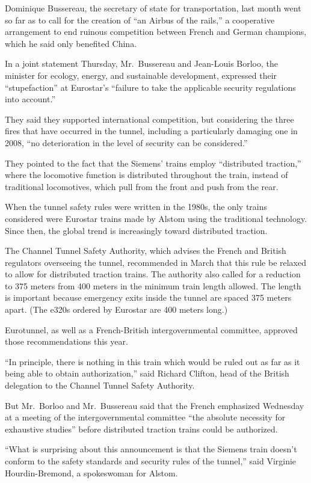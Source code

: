 ﻿\documentclass[12pt]{article}
\begin{document}
Dominique Bussereau, the secretary of state for transportation, last month went so far as to call
for the creation of ``an Airbus of the rails,'' a cooperative arrangement to end ruinous competition
between French and German champions, which he said only benefited China.

In a joint statement Thursday, Mr.~Bussereau and Jean-Louis Borloo, the minister for ecology,
energy, and sustainable development, expressed their ``stupefaction'' at Eurostar's ``failure to
take the applicable security regulations into account.''

They said they supported international competition, but considering the three fires that have
occurred in the tunnel, including a particularly damaging one in 2008, ``no deterioration in the
level of security can be considered.''

They pointed to the fact that the Siemens' trains employ ``distributed traction,'' where the
locomotive function is distributed throughout the train, instead of traditional locomotives, which
pull from the front and push from the rear.

When the tunnel safety rules were written in the 1980s, the only trains considered were Eurostar
trains made by Alstom using the traditional technology. Since then, the global trend is increasingly
toward distributed traction.

The Channel Tunnel Safety Authority, which advises the French and British regulators overseeing the
tunnel, recommended in March that this rule be relaxed to allow for distributed traction trains. The
authority also called for a reduction to 375 meters from 400 meters in the minimum train length
allowed. The length is important because emergency exits inside the tunnel are spaced 375 meters
apart. (The e320s ordered by Eurostar are 400 meters long.)

Eurotunnel, as well as a French-British intergovernmental committee, approved those recommendations
this year.

``In principle, there is nothing in this train which would be ruled out as far as it being able to
obtain authorization,'' said Richard Clifton, head of the British delegation to the Channel Tunnel
Safety Authority.

But Mr.~Borloo and Mr.~Bussereau said that the French emphasized Wednesday at a meeting of the
intergovernmental committee ``the absolute necessity for exhaustive studies'' before distributed
traction trains could be authorized.

``What is surprising about this announcement is that the Siemens train doesn't conform to the safety
standards and security rules of the tunnel,'' said Virginie Hourdin-Bremond, a spokeswoman for
Alstom.
\end{document}
